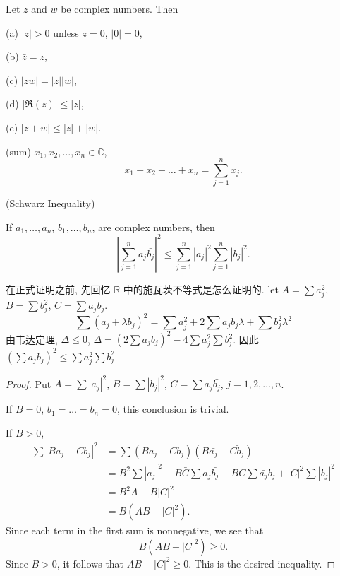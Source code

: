 \begin{thm}\label{thm:1.33}
    Let $z$ and $w$ be complex numbers. Then
    
    (a) $|z|>0$ unless $z=0$, $|0|=0$,

    (b) $\bar{z}=z$,

    (c) $|zw| = |z||w|$,

    (d) $| \Re(z)| \leq |z|$,

    (e) $|z+w| \leq|z|+|w|$.

\end{thm}


\begin{myNotation}\label{myNotation:sum}
(sum)
$x_1,x_2,\dots,x_n \in \mathbb{C}$,
\begin{equation*}
    x_1+x_2+\dots+x_n = \sum_{j=1}^{n} x_j.
\end{equation*}
\end{myNotation}

\begin{thm}\label{thm:schwarz_inequality}
    (Schwarz Inequality)

    If 
    $a_1,\dots,a_n$, 
    $b_1,\dots,b_n$, are complex numbers, then
    \begin{equation*}
        \left| \sum_{j=1}^{n}a_j \bar{b_j}\right|^2 \leq 
        \sum_{j=1}^{n}\left|a_j\right|^2
        \sum_{j=1}^{n}\left|b_j\right|^2.
    \end{equation*}    
\end{thm}

在正式证明之前, 先回忆 $\mathbb{R}$ 中的施瓦茨不等式是怎么证明的.
let $A = \sum a_j^2$, $B = \sum b_j^2$, $C = \sum a_j b_j$.
\begin{equation*}
    \sum (a_j+\lambda b_j)^2 = 
    \sum a_j^2 
    + 2\sum a_j b_j \lambda
    + \sum b_j^2 \lambda^2
\end{equation*}
由韦达定理, $\Delta \leq 0$, $\Delta= (2\sum a_j b_j )^2 - 4 \sum a_j^2\sum b_j^2$. 
因此 $(\sum a_j b_j )^2 \leq \sum a_j^2\sum b_j^2$
\begin{proof}
    Put $A = \sum |a_j|^2$, $B = \sum |b_j|^2$, $C = \sum a_j \bar{b_j}$, $j = 1,2,\dots,n$. 
    
    If $B = 0$, $b_1 = \dots = b_n = 0$, this conclusion is trivial.

    If $B > 0$, 
    \begin{align*}
        \sum \left|B a_j - C b_j\right|^2
        &= \sum (B a_j-C b_j)(B \bar{a_j} - \bar{C b_j})\\
        &= B^2\sum \left|a_j\right|^2 - B\bar{C}\sum a_j \bar{b_j} - BC \sum \bar{a_j} b_j + \left|C\right|^2\sum |b_j|^2\\
        &= B^2A-B|C|^2\\
        &= B(AB-|C|^2).
    \end{align*}
    Since each term in the first sum is nonnegative, we see that
    \begin{equation*}
        B(AB-|C|^2) \geq 0.
    \end{equation*}
    Since $B>0$, it follows that $AB-|C|^2 \geq 0$. This is the desired inequality.
\end{proof}


